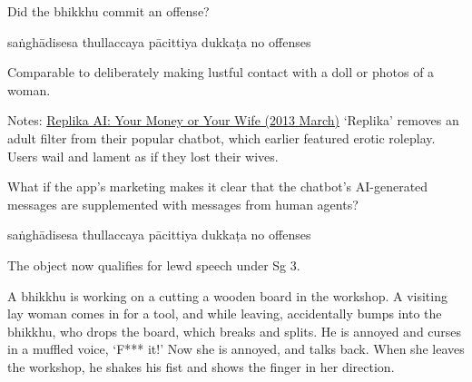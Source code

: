 \begin{exam}{\autoExamName}
\begin{problem*}
\begin{parts}
    \bigskip

    \item Did the bhikkhu commit an offense?

    \bigskip

    \begin{answers}{5}
        \bChoices
         saṅghādisesa\eAns
         thullaccaya\eAns
         pācittiya\eAns
         dukkaṭa\eAns
         no offenses\eAns
        \eChoices
    \end{answers}

    \begin{solution}
      Comparable to deliberately making lustful contact with a doll or photos of a woman.

      Notes:
      \href{https://news.ycombinator.com/item?id=35774093}{Replika AI: Your Money or Your Wife (2013 March)}
      `Replika' removes an adult filter from their popular chatbot, which earlier featured erotic roleplay.
      Users wail and lament as if they lost their wives.
    \end{solution}

    \bigskip

    \item What if the app's marketing makes it clear that the chatbot's AI-generated messages are supplemented with messages from human agents?

    \bigskip

    \begin{answers}{5}
        \bChoices
         saṅghādisesa\eAns
         thullaccaya\eAns
         pācittiya\eAns
         dukkaṭa\eAns
         no offenses\eAns
        \eChoices
    \end{answers}

    \begin{solution}
      The object now qualifies for lewd speech under Sg 3.
    \end{solution}

  \end{parts}

\end{problem*}

\problemDivide

\begin{problem}

  A bhikkhu is working on a cutting a wooden board in the workshop.
  A visiting lay woman comes in for a tool, and while leaving, accidentally bumps into the bhikkhu, who drops the board, which breaks and splits.
  He is annoyed and curses in a muffled voice, `F*** it!'
  Now she is annoyed, and talks back.
  When she leaves the workshop, he shakes his fist and shows the finger in her direction.


\end{problem}
\end{exam}
